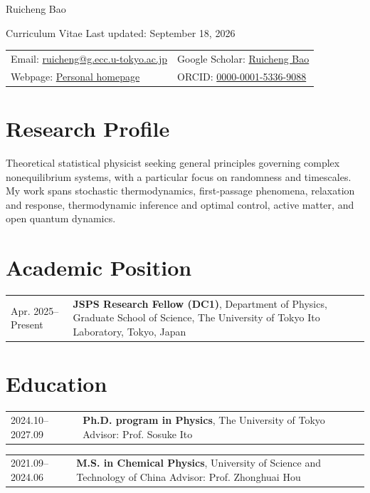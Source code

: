 \documentclass[10pt,a4paper]{article}
\makeatletter
\newcommand{\entry}[2]{%
  \begin{tabularx}{\textwidth}[t]{@{}>{\raggedright\arraybackslash}p{0.19\textwidth}>{\raggedright\arraybackslash}X@{}}
    \strut\color{muted}#1 & \strut#2
  \end{tabularx}\par
}
\makeatother
\begin{document}
\begin{center}
  {\fontsize{27}{31}\selectfont Ruicheng Bao}\par
  \vspace{0.25em}
  {\small\color{muted}Curriculum Vitae \enspace\textbar\enspace Last updated: September 18, 2026}
\end{center}

\vspace{0.65em}
\begin{tabularx}{\textwidth}{@{}>{\raggedright\arraybackslash}X >{\raggedleft\arraybackslash}X@{}}
  Email: \href{mailto:ruicheng@g.ecc.u-tokyo.ac.jp}{ruicheng@g.ecc.u-tokyo.ac.jp} &
  Google Scholar: \href{https://scholar.google.com/citations?user=ZSFCDtUAAAAJ}{Ruicheng Bao} \\
  Webpage: \href{https://ruichengbao.github.io/}{Personal homepage} &
  ORCID: \href{https://orcid.org/0000-0001-5336-9088}{0000-0001-5336-9088}
\end{tabularx}

\section{Research Profile}

Theoretical statistical physicist seeking general principles governing complex nonequilibrium systems, with a particular focus on randomness and timescales. My work spans stochastic thermodynamics, first-passage phenomena, relaxation and response, thermodynamic inference and optimal control, active matter, and open quantum dynamics.


\section{Academic Position}

\entry{Apr. 2025--Present}{\textbf{JSPS Research Fellow (DC1)}, Department of Physics, Graduate School of Science, The University of Tokyo\newline
Ito Laboratory, Tokyo, Japan}

\section{Education}

\entry{2024.10--2027.09}{\textbf{Ph.D. program in Physics}, The University of Tokyo\newline
Advisor: Prof. Sosuke Ito}

\entry{2021.09--2024.06}{\textbf{M.S. in Chemical Physics}, University of Science and Technology of China\newline
Advisor: Prof. Zhonghuai Hou}
\end{document}
